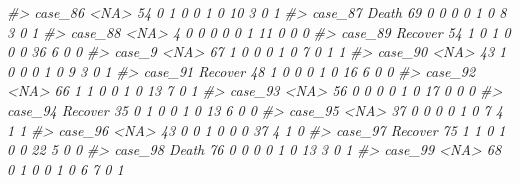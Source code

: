 \documentclass[]{book}
\newenvironment{Shaded}{\begin{snugshade}}{\end{snugshade}}
\newcommand{\CommentTok}[1]{\textcolor[rgb]{0.56,0.35,0.01}{\textit{#1}}}
\begin{document}
\begin{Shaded}
\begin{Highlighting}[]
\CommentTok{#> case_86     <NA>  54        0        1                0                 0                 1              0                    10                      3           0             1}
\CommentTok{#> case_87    Death  69        0        0                0                 0                 1              0                     8                      3           0             1}
\CommentTok{#> case_88     <NA>   4        0        0                0                 0                 0              1                    11                      0           0             0}
\CommentTok{#> case_89  Recover  54        1        0                1                 0                 0              0                    36                      6           0             0}
\CommentTok{#> case_9      <NA>  67        1        0                0                 0                 1              0                     7                      0           1             1}
\CommentTok{#> case_90     <NA>  43        1        0                0                 0                 1              0                     9                      3           0             1}
\CommentTok{#> case_91  Recover  48        1        0                0                 0                 1              0                    16                      6           0             0}
\CommentTok{#> case_92     <NA>  66        1        1                0                 0                 1              0                    13                      7           0             1}
\CommentTok{#> case_93     <NA>  56        0        0                0                 0                 1              0                    17                      0           0             0}
\CommentTok{#> case_94  Recover  35        0        1                0                 0                 1              0                    13                      6           0             0}
\CommentTok{#> case_95     <NA>  37        0        0                0                 0                 1              0                     7                      4           1             1}
\CommentTok{#> case_96     <NA>  43        0        0                1                 0                 0              0                    37                      4           1             0}
\CommentTok{#> case_97  Recover  75        1        1                0                 1                 0              0                    22                      5           0             0}
\CommentTok{#> case_98    Death  76        0        0                0                 0                 1              0                    13                      3           0             1}
\CommentTok{#> case_99     <NA>  68        0        1                0                 0                 1              0                     6                      7           0             1}
\end{Highlighting}
\end{Shaded}
\end{document}
